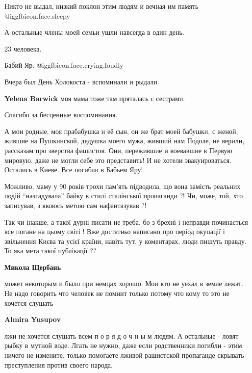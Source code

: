 \begin{itemize}
\begin{itemize}
Никто не выдал, низкий поклон этим людям и вечная им память @igg{fbicon.face.sleepy} 

А остальные члены моей семьи ушли навсегда в один день.

23 человека.

Бабий Яр. @igg{fbicon.face.crying.loudly} 

Вчера был День Холокоста - вспоминали и рыдали.

\textbf{Yelena Barwick} моя мама тоже там пряталась с сестрами.
\end{itemize} %

Спасибо за бесценные воспоминания.


А мои родные, моя прабабушка и её сын, он же брат моей бабушки, с женой, жившие
на Пушкинской, дедушка моего мужа, живший нам Подоле, не верили, рассказам про
зверства фашистов. Они, пережившие и воевавшие в Первую мировую, даже не могли
себе это представить! И не хотели эвакуироваться. Остались в Киеве. Все погибли
в Бабьем Яру!


Можливо, маму у 90 років трохи пам'ять підводила, що вона замість реальних
подій \enquote{назгадувала} байку в стилі сталінської пропаганди ?! Чи, може, той,
хто записував, з якоюсь метою сам нафантазував ?!

Так чи інакше, а такої дурні писати не треба, бо з брехні і неправди
починається все погане на цьому світі ! Вже достатньо написано про період
окупації і звільнення Києва та усієї країни, навіть тут, у коментарах, люди
пишуть правду. То яка мета такої публікації ??

\begin{itemize} %
\textbf{Микола Щербань} 

может некоторым и было при немцах хорошо. Мои кто не уехал в земле лежат. Не
надо говорить что человек не помнит только потому что кому то это не хочется
слушать

\begin{itemize} %
\textbf{Almira Yusupov} 

лжи не хочется слушать всем п о р я д о ч н ы м людям. А остальные - ловят
рыбку в мутной воде. Лгать не нужно, даже если родственники погибли - этим
ничего не измените, только помогаете лживой рашистской пропаганде скрывать
преступления против своего народа.


\end{itemize}
\end{itemize}
\end{itemize}
